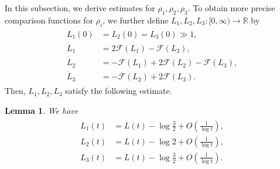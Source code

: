 \documentclass[10pt,a4paper]{amsart}
\newtheorem{lemma}[theorem]{Lemma}
\numberwithin{equation}{section}
\begin{document}
In this subsection, we derive estimates for $\rho_1,\rho_2,\rho_3$. To obtain more precise comparison functions for $\rho_i$, we further define $L_1,L_2,L_3:[0,\infty)\to\mathbb{R}$ by
\begin{align}\label{L_iode}
\begin{aligned}
L_1(0)&=L_2(0)=L_3(0)\gg 1,
\\
\dot{L}_1&=2\mathcal{F}(L_1)-\mathcal{F}(L_2),
\\
\dot{L}_2&=-\mathcal{F}(L_1)+2\mathcal{F}(L_2)-\mathcal{F}(L_3),
\\
\dot{L}_3&=-\mathcal{F}(L_2)+2\mathcal{F}(L_3).
\end{aligned}
\end{align}
Then, $L_1,L_2,L_3$ satisfy the following estimate.
\begin{lemma}\label{Liasymptotics}
We have
\begin{align}\label{Linagasa}
\begin{aligned}
L_1(t)&=L(t)-\log{\frac{3}{2}}+O\left(\frac{1}{\log{t}}\right),
\\
L_2(t)&=L(t)-\log{2}+O\left(\frac{1}{\log{t}}\right),
\\
L_3(t)&=L(t)-\log{\frac{3}{2}}+O\left(\frac{1}{\log{t}}\right).
\end{aligned}
\end{align}
\end{lemma}
\end{document}
